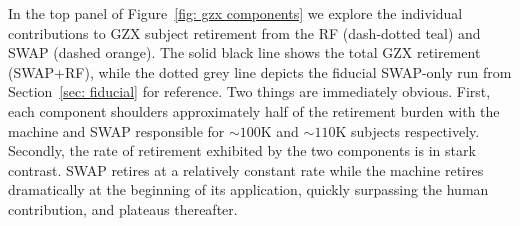 \documentclass[twocolumn, trackchanges, linenumbers]{aastex6}%
\begin{document}
In the top panel of Figure~\ref{fig: gzx components} we explore the individual 
contributions to GZX subject retirement from the RF (dash-dotted teal) and SWAP (dashed orange). 
The solid black line shows the total GZX retirement (SWAP+RF), while the dotted grey line depicts 
the fiducial SWAP-only run from Section~\ref{sec: fiducial} for reference. 
Two things are immediately obvious. First, each component shoulders approximately
half of the retirement burden with the machine and SWAP responsible for $\sim$$100$K and $\sim$$110$K subjects respectively.  
	Secondly, the rate of retirement exhibited by the two components is in stark contrast.
SWAP retires at a relatively constant rate while the machine retires 
dramatically at the beginning of its application, quickly surpassing the human 
contribution, and plateaus thereafter. 
\end{document}
